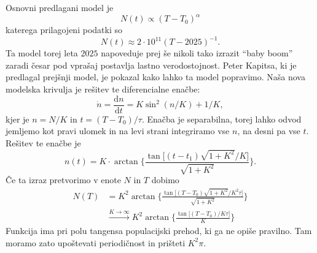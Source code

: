\documentclass[a4 paper, 12pt]{article}
\begin{document}
Osnovni predlagani model je
\[
	N(t) \propto (T - T_0)^\alpha
\]
katerega prilagojeni podatki so
\[
	N(t) \approx 2\cdot10^{11} (T - 2025)^{-1}.
\]
Ta model torej leta $2025$ napoveduje prej \v se nikoli tako izrazit "`baby boom"' zaradi \v cesar pod vpra\v saj postavlja
lastno verodostojnost. Peter Kapitsa, ki je predlagal prej\v snji model, je pokazal kako lahko ta model popravimo.
Na\v sa nova modelska krivulja je re\v sitev te diferencialne ena\v cbe:
\[
	\dot{n} = \frac{\mathrm{d}n}{\mathrm{d}t} = K\sin^2(n/K) + 1/K,
\]
kjer je $n = N/K$ in $t = (T - T_0)/\tau$. Ena\v cba je separabilna, torej lahko odvod jemljemo kot pravi ulomek
in na levi strani integriramo vse $n$, na desni pa vse $t$. Re\v sitev te ena\v cbe je
\[
	n(t) = K \cdot \arctan\Bigg\{\frac{\tan\big[(t - t_1)\sqrt{1 + K^2}/K\big]}{\sqrt{1 + K^2}}\Bigg\}.
\]
\v Ce ta izraz pretvorimo v enote $N$ in $T$ dobimo
\begin{align*}
	N(T) &= K^2 \arctan\Bigg\{\frac{\tan\big[(T - T_0)\sqrt{1 + K^2}/K^2\tau\big]}{\sqrt{1 + K^2}}\Bigg\} \\
	     &\stackrel{K \to \infty}{\longrightarrow} K^2 \arctan\Bigg\{\frac{\tan\big[(T - T_0)/K\tau\big]}{K}\Bigg\}
\end{align*}
Funkcija ima pri polu tangensa populacijski prehod, ki ga ne opi\v se pravilno. Tam moramo zato upo\v stevati
periodi\v cnost in pri\v steti $K^2 \pi$.
\end{document}

